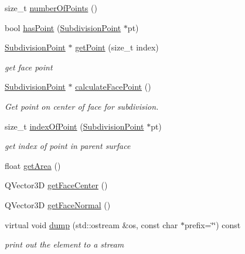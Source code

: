 \begin{DoxyCompactItemize}
\item 
size\-\_\-t \hyperlink{classShipCADGeometry_1_1SubdivisionFace_acb8b1174cf96615f4e84ca4e62f5979c}{number\-Of\-Points} ()
\item 
bool \hyperlink{classShipCADGeometry_1_1SubdivisionFace_a575f9199178fc28c9229fa4c7d2824ef}{has\-Point} (\hyperlink{classShipCADGeometry_1_1SubdivisionPoint}{Subdivision\-Point} $\ast$pt)
\item 
\hyperlink{classShipCADGeometry_1_1SubdivisionPoint}{Subdivision\-Point} $\ast$ \hyperlink{classShipCADGeometry_1_1SubdivisionFace_a0df579a3063c124ca2355eba4ece7480}{get\-Point} (size\-\_\-t index)
\begin{DoxyCompactList}\small\item\em get face point \end{DoxyCompactList}\item 
\hyperlink{classShipCADGeometry_1_1SubdivisionPoint}{Subdivision\-Point} $\ast$ \hyperlink{classShipCADGeometry_1_1SubdivisionFace_aeb9c6f01f3896dc39819265922a04892}{calculate\-Face\-Point} ()
\begin{DoxyCompactList}\small\item\em Get point on center of face for subdivision. \end{DoxyCompactList}\item 
size\-\_\-t \hyperlink{classShipCADGeometry_1_1SubdivisionFace_a8b32525b95c836e065cb124a61caec61}{index\-Of\-Point} (\hyperlink{classShipCADGeometry_1_1SubdivisionPoint}{Subdivision\-Point} $\ast$pt)
\begin{DoxyCompactList}\small\item\em get index of point in parent surface \end{DoxyCompactList}\item 
float \hyperlink{classShipCADGeometry_1_1SubdivisionFace_ace99f0fe3b54e57912e5391e0aff84ea}{get\-Area} ()
\item 
Q\-Vector3\-D \hyperlink{classShipCADGeometry_1_1SubdivisionFace_a3574fd6a4241a81faa7f2ff741d07811}{get\-Face\-Center} ()
\item 
Q\-Vector3\-D \hyperlink{classShipCADGeometry_1_1SubdivisionFace_add361089333f9d08a411d16ea1782246}{get\-Face\-Normal} ()
\item 
virtual void \hyperlink{classShipCADGeometry_1_1SubdivisionFace_aa5bd261ae5fc0a1c7fe8cc5328b8477f}{dump} (std\-::ostream \&os, const char $\ast$prefix=\char`\"{}\char`\"{}) const 
\begin{DoxyCompactList}\small\item\em print out the element to a stream \end{DoxyCompactList}\end{DoxyCompactItemize}
